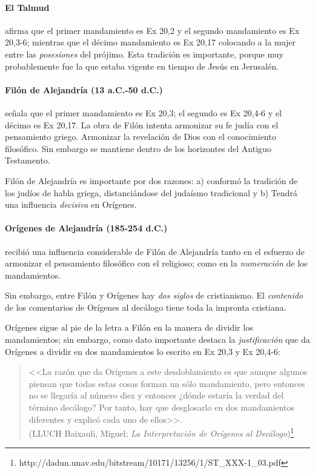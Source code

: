 \documentclass{article}
\begin{document}
\paragraph{El Talmud}

afirma que el primer mandamiento es Ex 20,2 y el segundo mandamiento es Ex 20,3-6; mientras que el d\'ecimo mandamiento es Ex 20,17 colocando a la mujer entre las \emph{posesiones} del pr\'ojimo. Esta tradici\'on es importante, porque muy probablemente fue la que estaba vigente en tiempo de Jes\'us en Jerusal\'en.

\paragraph{Fil\'on de Alejandr\'{i}a  (13 a.C.-50 d.C.)}

se\~nala que el primer mandamiento es Ex 20,3; el segundo es Ex 20,4-6 y el d\'ecimo es Ex 20,17. La obra de Fil\'on intenta armonizar su fe jud\'{i}a con el pensamiento griego. Armonizar la revelaci\'on de Dios con el conocimiento filos\'ofico. Sin embargo se mantiene dentro de los horizontes del Antiguo Testamento.

Fil\'on de Alejandr\'{i}a es importante por dos razones: a) conform\'o la tradici\'on de los jud\'{i}os de habla griega, distanci\'andose del juda\'{i}smo tradicional y b) Tendr\'a una influencia \emph{decisiva} en Or\'{i}genes.

\paragraph{Or\'{i}genes de Alejandr\'{i}a (185-254 d.C.)}

recibi\'o una influencia considerable de Fil\'{o}n de Alejandr\'{i}a tanto en el esfuerzo de armonizar el pensamiento filos\'{o}fico con el religioso; como en la \emph{numeraci\'on} de los mandamientos.

Sin embargo, entre Fil\'on y Or\'{i}genes hay \emph{dos siglos} de cristianismo. El \emph{contenido} de los comentarios de Or\'{i}genes al dec\'alogo tiene toda la impronta cristiana.

Or\'{i}genes sigue al pie de la letra a Fil\'on en la manera de dividir los mandamientos; sin embargo, como dato importante destaca la \emph{justificaci\'on} que da Or\'{i}genes a dividir en dos mandamientos lo escrito en Ex 20,3 y Ex 20,4-6:

\begin{quote}
<<La razón que da Orígenes a este desdoblamiento es que aunque
algunos piensan que todas estas cosas forman un sólo mandamiento, pero
entonces no se llegaría al número diez y entonces ¿dónde estaría la verdad
del término decálogo? Por tanto, hay que desglosarlo en dos mandamientos
diferentes y explicó cada uno de ellos>>.\\
(LLUCH Baixauli, Miguel; \emph{La Interpretación de Orígenes al Decálogo})\footnote{http://dadun.unav.edu/bitstream/10171/13256/1/ST\_XXX-1\_03.pdf}
\end{quote}
\end{document}
